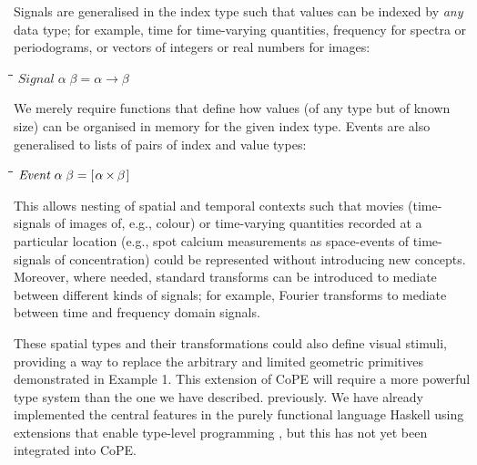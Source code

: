 \documentclass[11pt]{article}
\newlength{\lwidth}\setlength{\lwidth}{4.5cm}
\newlength{\cwidth}\setlength{\cwidth}{8mm} %
\newcommand{\Conid}[1]{\mathit{#1}}
\begin{document}
Signals are generalised in the index type such that values can
be indexed by \emph{any} data type; for example, time for time-varying
quantities, frequency for spectra or periodograms, or vectors of
integers or real numbers for images:
\begin{tabbing}
\qquad\=\hspace{\lwidth}\=\hspace{\cwidth}\=\+\kill
$\Conid{Signal}\;\alpha\;\beta\mathrel{=}\alpha \to \beta$
\end{tabbing}
We merely require functions that define how values (of any type but of
known size) can be organised in memory for the given index type.
%
Events are also generalised to lists of pairs of index and value types: 
\begin{tabbing}
\qquad\=\hspace{\lwidth}\=\hspace{\cwidth}\=\+\kill
${\Conid{Event}\;\alpha\;\beta\mathrel{=}[\mskip1.5mu \alpha\;\!\!\times\!\!\;\beta\mskip1.5mu]}$
\end{tabbing}
This allows nesting of spatial and temporal contexts such that movies
(time-signals of images of, e.g., colour) or time-varying quantities
recorded at a particular location (e.g., spot calcium
measurements as space-events of time-signals of
concentration\cite{DiGregorio1999}) could be represented without
introducing new concepts. Moreover, where needed, standard transforms
can be introduced to mediate between different kinds of signals; for example,
Fourier transforms to mediate between time and frequency domain signals.

These spatial types and their transformations could also define visual
stimuli, providing a way to replace the arbitrary and limited
geometric primitives demonstrated in Example 1. This extension of CoPE
will require a more powerful type system than the one we have described.
previously. We have already implemented the central features in the purely
functional language Haskell using extensions that enable type-level
programming \cite{Kiselyov2010}, but this has not yet been integrated
into CoPE.
\end{document}
